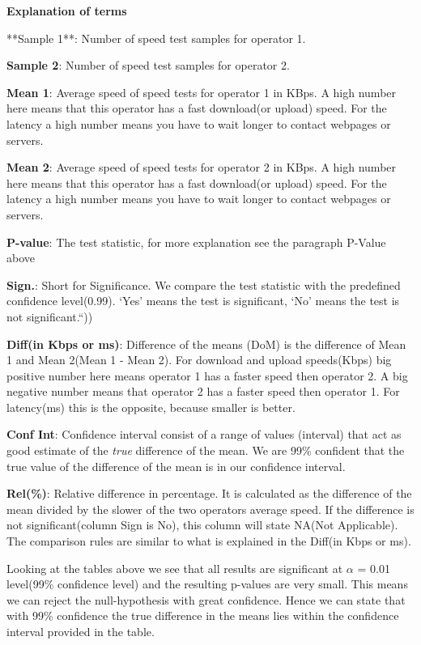 \documentclass[]{article}
\begin{document}
\textbf{Explanation of terms}

\footnotesize
**Sample 1**: Number of speed test samples for operator 1.

\textbf{Sample 2}: Number of speed test samples for operator 2.

\textbf{Mean 1}: Average speed of speed tests for operator 1 in KBps. A
high number here means that this operator has a fast download(or upload)
speed. For the latency a high number means you have to wait longer to
contact webpages or servers.

\textbf{Mean 2}: Average speed of speed tests for operator 2 in KBps. A
high number here means that this operator has a fast download(or upload)
speed. For the latency a high number means you have to wait longer to
contact webpages or servers.

\textbf{P-value}: The test statistic, for more explanation see the
paragraph P-Value above

\textbf{Sign.}: Short for Significance. We compare the test statistic
with the predefined confidence level(0.99). `Yes' means the test is
significant, `No' means the test is not significant.``))

\textbf{Diff(in Kbps or ms)}: Difference of the means (DoM) is the
difference of Mean 1 and Mean 2(Mean 1 - Mean 2). For download and
upload speeds(Kbps) big positive number here means operator 1 has a
faster speed then operator 2. A big negative number means that operator
2 has a faster speed then operator 1. For latency(ms) this is the
opposite, because smaller is better.

\textbf{Conf Int}: Confidence interval consist of a range of values
(interval) that act as good estimate of the \emph{true} difference of
the mean. We are 99\% confident that the true value of the difference of
the mean is in our confidence interval.

\textbf{Rel(\%)}: Relative difference in percentage. It is calculated as
the difference of the mean divided by the slower of the two operators
average speed. If the difference is not significant(column Sign is No),
this column will state NA(Not Applicable). The comparison rules are
similar to what is explained in the Diff(in Kbps or ms).

\normalsize
Looking at the tables above we see that all results are significant at
$\alpha$ = 0.01 level(99\% confidence level) and the resulting p-values
are very small. This means we can reject the null-hypothesis with great
confidence. Hence we can state that with 99\% confidence the true
difference in the means lies within the confidence interval provided in
the table.
\end{document}
